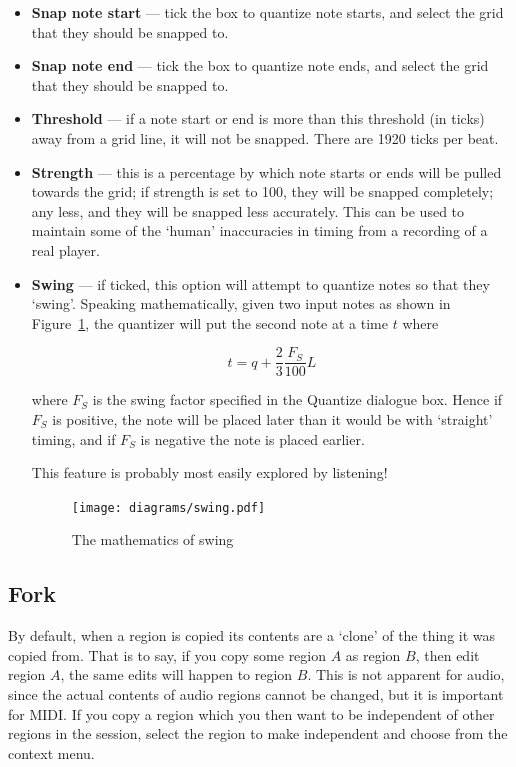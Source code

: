 \documentclass[10pt,a4paper]{book}
\newcommand{\dialogue}[1]{#1}
\newcommand{\menu}[1]{\emph{\StrSubstitute{#1}{,}{ $\rightarrow$ }}}
\begin{document}
\begin{itemize}
\item \textbf{Snap note start} --- tick the box to quantize note
  starts, and select the grid that they should be snapped to.
\item \textbf{Snap note end} --- tick the box to quantize note
  ends, and select the grid that they should be snapped to.
\item \textbf{Threshold} --- if a note start or end is more than this
  threshold (in ticks) away from a grid line, it will not be snapped.
  There are 1920 ticks per beat.
\item \textbf{Strength} --- this is a percentage by which note starts
  or ends will be pulled towards the grid; if strength is set to 100,
  they will be snapped completely; any less, and they will be snapped
  less accurately.  This can be used to maintain some of the `human'
  inaccuracies in timing from a recording of a real player.
\item \textbf{Swing} --- if ticked, this option will attempt to
  quantize notes so that they `swing'.  Speaking mathematically, given
  two input notes as shown in Figure~\ref{fig:swing-maths}, the
  quantizer will put the second note at a time $t$ where

\begin{equation}
t = q + \frac{2}{3} \frac{F_S}{100} L
\end{equation}

where $F_S$ is the swing factor specified in the \dialogue{Quantize}
dialogue box.  Hence if $F_S$ is positive, the note will be placed
later than it would be with `straight' timing, and if $F_S$ is
negative the note is placed earlier.

This feature is probably most easily explored by listening!

\begin{figure}[ht]
\begin{center}
\texttt{[image: diagrams/swing.pdf]}
\end{center}
\caption{The mathematics of swing}
\label{fig:swing-maths}
\end{figure}

\end{itemize}


\subsection{Fork}

By default, when a region is copied its contents are a `clone' of the
thing it was copied from.  That is to say, if you copy some region $A$
as region $B$, then edit region $A$, the same edits will happen to
region $B$.  This is not apparent for audio, since the actual contents
of audio regions cannot be changed, but it is important for MIDI.  If
you copy a region which you then want to be independent of other
regions in the session, select the region to make independent and
choose \menu{MIDI,Fork} from the context menu.
\end{document}
